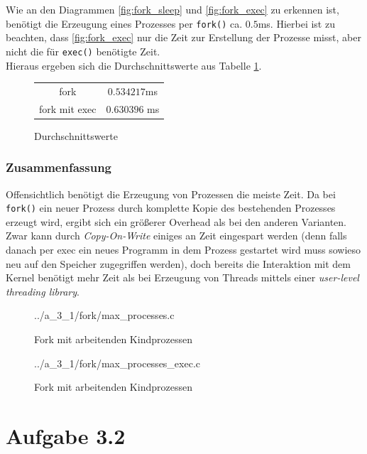 \documentclass[a4paper,
12pt,
BCOR12mm,
]{scrartcl}
\begin{document}
Wie an den Diagrammen \ref{fig:fork_sleep} und \ref{fig:fork_exec} zu erkennen ist,
benötigt die Erzeugung eines Prozesses per \verb|fork()| ca. $0.5$ms.
Hierbei ist zu beachten, dass \ref{fig:fork_exec} nur die Zeit zur Erstellung der Prozesse
misst, aber nicht die für \verb|exec()| benötigte Zeit. \\
Hieraus ergeben sich die Durchschnittswerte aus Tabelle \ref{fig:fork_mean}.
\begin{figure}[h!]
	\begin{center}
		\begin{tabular}[h!]{c|c}
			\hline
			fork & $0.534217$ms	 \\
			fork mit exec & $0.630396$ ms\\
			\hline
		\end{tabular}
	\end{center}
	\caption{Durchschnittswerte}
	\label{fig:fork_mean}
\end{figure}

\subsubsection{Zusammenfassung}
Offensichtlich benötigt die Erzeugung von Prozessen die meiste Zeit. Da bei
\verb|fork()| ein neuer Prozess durch komplette Kopie des bestehenden Prozesses
erzeugt wird, ergibt sich ein größerer Overhead als bei den anderen Varianten. Zwar
kann durch \emph{Copy-On-Write} einiges an Zeit eingespart werden (denn falls danach per
exec ein neues Programm in dem Prozess gestartet wird muss sowieso neu auf den Speicher
zugegriffen werden), doch bereits die Interaktion mit dem Kernel benötigt mehr Zeit als
bei Erzeugung von Threads mittels einer \emph{user-level threading library}.

\begin{figure}[h!]
	\begin{center}
		 {../a_3_1/fork/max_processes.c}
	\end{center}
	\caption{Fork mit arbeitenden Kindprozessen}
	\label{fig:fork_listing}
\end{figure}
\begin{figure}[h!]
	\begin{center}
		 {../a_3_1/fork/max_processes_exec.c}
	\end{center}
	\caption{Fork mit arbeitenden Kindprozessen}
	\label{fig:fork_exec_listing}
\end{figure}
\section{Aufgabe 3.2}
\end{document}
